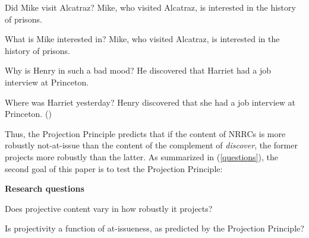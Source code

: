 \documentclass[11pt,fleqn]{article}
\newcommand{\6}{\mbox{$[\hspace*{-.6mm}[$}}
\newcommand{\9}{\mbox{$]\hspace*{-.6mm}]$}}
\def\infelic{{\leavevmode\llap{\#}}}
\begin{document}
\begin{exe}
\ex\label{nrrc}
\begin{xlist}
\ex
\begin{xlist}
 Did Mike visit Alcatraz?
 \infelic Mike, who visited Alcatraz, is interested in the history of prisons.
\end{xlist}


\ex
\begin{xlist}
 What is Mike interested in?
 Mike, who visited Alcatraz, is interested in the history of prisons.
\end{xlist}


\end{xlist}

\ex\label{discover}
\begin{xlist}

\ex
\begin{xlist}
 Why is Henry in such a bad mood?
 He discovered that Harriet had a job interview at Princeton. 
\end{xlist}

\ex
\begin{xlist}
 Where was Harriet yesterday?
 Henry discovered that she had a job interview at Princeton. \hfill (\citealt[1035]{simons07})
\end{xlist}
\end{xlist}
\end{exe}
Thus, the Projection Principle predicts that if the content of NRRCs is more robustly not-at-issue than the content of the complement of {\em discover}, the former projects more robustly than the latter. As summarized in (\ref{questions}), the second goal of this paper is to test the Projection Principle:

\begin{exe}
\ex\label{questions} {\bf Research questions}

\begin{xlist} 

\ex Does projective content vary in how robustly it projects?

\ex Is projectivity a function of at-issueness, as predicted by the Projection Principle?
\end{xlist}

\end{exe} 
\end{document}
